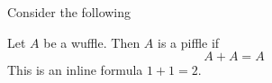 Consider the following
\begin{theorem}
  Let $A$ be a wuffle. Then $A$ is a piffle if
  \begin{equation*}
    A + A = A
  \end{equation*}
  This is an inline formula
$1+1=2$.
\end{theorem}
